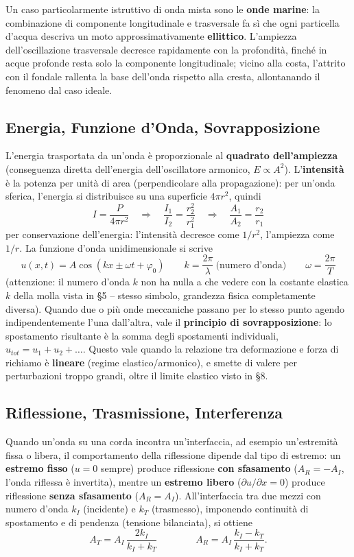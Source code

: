 \documentclass[a4paper,11pt]{article}
\begin{document}
Un caso particolarmente istruttivo di onda mista sono le \textbf{onde marine}: la combinazione di componente longitudinale e trasversale fa sì che ogni particella d'acqua descriva un moto approssimativamente \textbf{ellittico}. L'ampiezza dell'oscillazione trasversale decresce rapidamente con la profondità, finché in acque profonde resta solo la componente longitudinale; vicino alla costa, l'attrito con il fondale rallenta la base dell'onda rispetto alla cresta, allontanando il fenomeno dal caso ideale.

\subsection{Energia, Funzione d'Onda, Sovrapposizione}

L'energia trasportata da un'onda è proporzionale al \textbf{quadrato dell'ampiezza} (conseguenza diretta dell'energia dell'oscillatore armonico, $E\propto A^2$). L'\textbf{intensità} è la potenza per unità di area (perpendicolare alla propagazione): per un'onda sferica, l'energia si distribuisce su una superficie $4\pi r^2$, quindi
\[
I = \frac{P}{4\pi r^2} \quad\Rightarrow\quad \frac{I_1}{I_2}=\frac{r_2^2}{r_1^2} \quad\Rightarrow\quad \frac{A_1}{A_2}=\frac{r_2}{r_1}
\]
per conservazione dell'energia: l'intensità decresce come $1/r^2$, l'ampiezza come $1/r$. La funzione d'onda unidimensionale si scrive
\[
u(x,t) = A\cos(kx\pm\omega t+\varphi_0) \qquad k=\frac{2\pi}{\lambda}\ \text{(numero d'onda)} \qquad \omega=\frac{2\pi}{T}
\]
(attenzione: il numero d'onda $k$ non ha nulla a che vedere con la costante elastica $k$ della molla vista in \S5 -- stesso simbolo, grandezza fisica completamente diversa). Quando due o più onde meccaniche passano per lo stesso punto agendo indipendentemente l'una dall'altra, vale il \textbf{principio di sovrapposizione}: lo spostamento risultante è la somma degli spostamenti individuali, $u_{tot}=u_1+u_2+\ldots$. Questo vale quando la relazione tra deformazione e forza di richiamo è \textbf{lineare} (regime elastico/armonico), e smette di valere per perturbazioni troppo grandi, oltre il limite elastico visto in \S8.

\subsection{Riflessione, Trasmissione, Interferenza}

Quando un'onda su una corda incontra un'interfaccia, ad esempio un'estremità fissa o libera, il comportamento della riflessione dipende dal tipo di estremo: un \textbf{estremo fisso} ($u=0$ sempre) produce riflessione \textbf{con sfasamento} ($A_R=-A_I$, l'onda riflessa è invertita), mentre un \textbf{estremo libero} ($\partial u/\partial x=0$) produce riflessione \textbf{senza sfasamento} ($A_R=A_I$). All'interfaccia tra due mezzi con numero d'onda $k_I$ (incidente) e $k_T$ (trasmesso), imponendo continuità di spostamento e di pendenza (tensione bilanciata), si ottiene
\[
A_T = A_I\,\frac{2k_I}{k_I+k_T} \qquad\qquad A_R = A_I\,\frac{k_I-k_T}{k_I+k_T}.
\]
\end{document}
